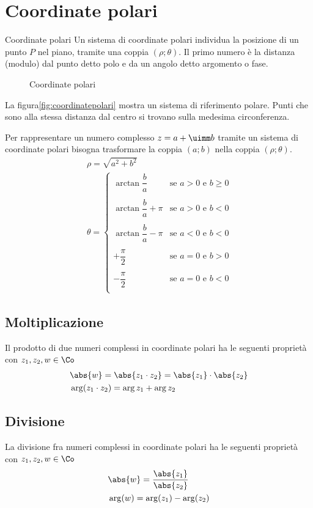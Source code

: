 \section{Coordinate polari}
\begin{definizionet}{Coordinate polari}{}
Un sistema di coordinate polari individua la posizione di un punto $P$ nel piano, tramite una coppia $(\rho;\theta)$.  Il primo numero è la distanza (modulo) dal punto detto polo e da un angolo detto argomento o fase.
\end{definizionet}
\begin{figure} %
	\centering

	\caption{Coordinate polari}
	\label{fig:coordinatepolari}
\end{figure}
La figura\nobs\vref{fig:coordinatepolari} mostra un sistema di riferimento polare. Punti che sono alla stessa distanza dal centro si trovano sulla medesima circonferenza. 

Per rappresentare un numero complesso $z=a+\uimm b$ tramite un sistema di coordinate polari bisogna trasformare la coppia $(a;b)$
nella coppia $(\rho;\theta)$.
\begin{align*}
&\rho=\sqrt{a^2+b^2}\\
&\theta=\begin{cases}
\arctan{\dfrac{b}{a}}&\text{se $a>0$ e $b\geq 0$ }\\
&\\
\arctan{\dfrac{b}{a}}+\pi&\text{se $a>0$ e $b< 0$ }\\
&\\
\arctan{\dfrac{b}{a}}-\pi&\text{se $a<0$ e $b< 0$ }\\
&\\
+\dfrac{\pi}{2}&\text{se $a=0$ e $b> 0$ }\\
&\\
-\dfrac{\pi}{2}&\text{se $a=0$ e $b< 0$ }\\
\end{cases}
\end{align*} 
\subsection{Moltiplicazione}
Il prodotto di due numeri complessi in coordinate polari ha le seguenti proprietà  con $z_1,z_2,w\in \Co$ 
\begin{align*}
&\abs{w}=\abs{z_1\cdot z_2}=\abs{z_1}\cdot\abs{z_2}\\
&\arg(z_1\cdot z_2)=\arg{z_1}+\arg{z_2}
\end{align*} 
\subsection{Divisione}
La divisione fra numeri complessi in coordinate polari ha le seguenti proprietà con $z_1,z_2,w\in \Co$ 
\begin{align*}
&\abs{w}=\dfrac{\abs{z_1}}{\abs{z_2}}\\
&\arg(w)=\arg (z_1)-\arg (z_2)
\end{align*}
